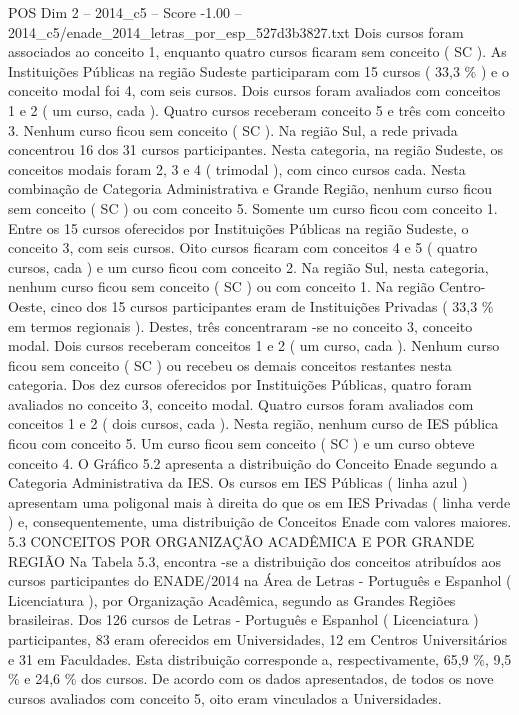 \begin{textsample}{POS Dim 2 – 2014\_c5 – Score -1.00 – 2014\_c5/enade\_2014\_letras\_por\_esp\_527d3b3827.txt}
Dois cursos foram associados ao conceito 1, enquanto quatro cursos ficaram sem conceito ( SC ).
As Instituições Públicas na região Sudeste participaram com 15 cursos ( 33,3 \% ) e o conceito modal foi 4, com seis cursos.
Dois cursos foram avaliados com conceitos 1 e 2 ( um curso, cada ).
Quatro cursos receberam conceito 5 e três com conceito 3.
Nenhum curso ficou sem conceito ( SC ).
Na região Sul, a rede privada concentrou 16 dos 31 cursos participantes.
Nesta categoria, na região Sudeste, os conceitos modais foram 2, 3 e 4 ( trimodal ), com cinco cursos cada.
Nesta combinação de Categoria Administrativa e Grande Região, nenhum curso ficou sem conceito ( SC ) ou com conceito 5.
Somente um curso ficou com conceito 1.
Entre os 15 cursos oferecidos por Instituições Públicas na região Sudeste, o conceito 3, com seis cursos.
Oito cursos ficaram com conceitos 4 e 5 ( quatro cursos, cada ) e um curso ficou com conceito 2.
Na região Sul, nesta categoria, nenhum curso ficou sem conceito ( SC ) ou com conceito 1.
Na região Centro-Oeste, cinco dos 15 cursos participantes eram de Instituições Privadas ( 33,3 \% em termos regionais ).
Destes, três concentraram -se no conceito 3, conceito modal.
Dois cursos receberam conceitos 1 e 2 ( um curso, cada ).
Nenhum curso ficou sem conceito ( SC ) ou recebeu os demais conceitos restantes nesta categoria.
Dos dez cursos oferecidos por Instituições Públicas, quatro foram avaliados no conceito 3, conceito modal.
Quatro cursos foram avaliados com conceitos 1 e 2 ( dois cursos, cada ).
Nesta região, nenhum curso de IES pública ficou com conceito 5.
Um curso ficou sem conceito ( SC ) e um curso obteve conceito 4.
O Gráfico 5.2 apresenta a distribuição do Conceito Enade segundo a Categoria Administrativa da IES.
Os cursos em IES Públicas ( linha azul ) apresentam uma poligonal mais à direita do que os em IES Privadas ( linha verde ) e, consequentemente, uma distribuição de Conceitos Enade com valores maiores. 5.3 CONCEITOS POR ORGANIZAÇÃO ACADÊMICA E POR GRANDE REGIÃO Na Tabela 5.3, encontra -se a distribuição dos conceitos atribuídos aos cursos participantes do ENADE/2014 na Área de Letras - Português e Espanhol ( Licenciatura ), por Organização Acadêmica, segundo as Grandes Regiões brasileiras.
Dos 126 cursos de Letras - Português e Espanhol ( Licenciatura ) participantes, 83 eram oferecidos em Universidades, 12 em Centros Universitários e 31 em Faculdades.
Esta distribuição corresponde a, respectivamente, 65,9 \%, 9,5 \% e 24,6 \% dos cursos.
De acordo com os dados apresentados, de todos os nove cursos avaliados com conceito 5, oito eram vinculados a Universidades.

\end{textsample}
